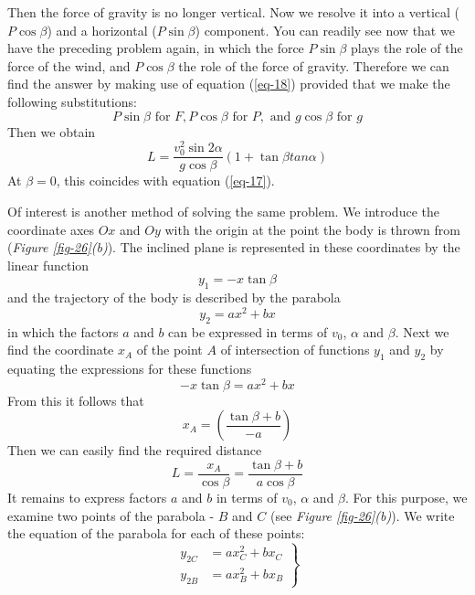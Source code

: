 \documentclass[a4paper,sfsidenotes]{tufte-book}
\begin{document}
Then the force of gravity is no longer vertical. Now we resolve it into a vertical ($P \cos \beta$) and
a horizontal ($P \sin \beta$) component. You can readily see now that we have the preceding problem again, in which the force $P \sin \beta$ plays the role of the force of the wind, and $P \cos \beta$ the role of the force of gravity. Therefore we can find the answer by making use of equation (\ref{eq-18}) provided that we make the following substitutions:
$$
P \sin \beta \, \, \text{for} \, \, F, P \cos \beta \, \, \text{for} \, \, P, \, \, \text{and} \, \, g \cos \beta \, \, \text{for} \, \, g
$$
Then we obtain
\begin{equation}
L= \frac{v_{0}^{2} \sin 2 \alpha}{g \cos \beta } \left( 1 + \tan \beta tan \alpha \right)
\label{eq-19}
\end{equation}
At $\beta =0$, this coincides with equation (\ref{eq-17}). 

Of interest is another method of solving the same problem. We introduce the coordinate axes $Ox$ and $Oy$ with the origin at the point the body is thrown from (\emph{Figure \ref{fig-26}(b)}). The inclined plane is represented in these coordinates by the linear function
$$
y_{1}=-x \tan \beta
$$
and the trajectory of the body is described by the parabola
$$
y_{2}= ax^{2}+bx
$$
in which the factors $a$ and $b$ can be expressed in terms of $v_{0}$, $\alpha$ and $\beta$. Next we find the coordinate $x_{A}$ of the point $A$ of intersection of functions $y_{1}$ and $y_{2}$ by equating the expressions for these functions
$$
- x \tan \beta = ax^{2} + bx
$$
From this it follows that 
$$
x_{A} = \left( \frac{\tan \beta+b}{-a} \right)
$$
Then we can easily find the required distance 
\begin{equation}
L= \frac{x_{A}}{\cos \beta } = \frac{ \tan \beta + b} {a \cos \beta}
\label{eq-20}
\end{equation}
It remains to express factors $a$ and $b$ in terms of $v_{0}$, $\alpha$ and $\beta$. For this purpose, we examine two points of the parabola - $B$ and $C$ (see \emph{Figure \ref{fig-26}(b)}). We write the equation of the parabola for each of these points:
\begin{equation*}
\left.
\begin{aligned}
 y_{2C} &= ax^{2}_{C} + bx_{C} \\
y_{2B} &= ax^{2}_{B} + bx_{B}
\end{aligned}
\right\}
\end{equation*}
\end{document}
